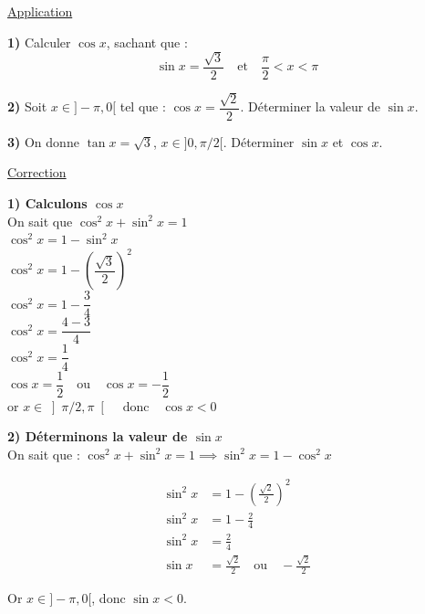 \documentclass[12pt,a4paper]{article}
\begin{document}
\begin{center}
    \textcolor{monRouge}{\underline{\Large Application}}
\end{center}

\noindent \textbf{1)} Calculer $\cos x$, sachant que :
\[ \sin x = \dfrac{\sqrt{3}}{2} \quad \text{et} \quad \dfrac{\pi}{2} < x < \pi \]

\noindent \textbf{2)} Soit $x \in ]-\pi, 0[$ tel que : $\cos x = \dfrac{\sqrt{2}}{2}$. Déterminer la valeur de $\sin x$.

\noindent \textbf{3)} On donne $\tan x = \sqrt{3}$, $x \in ]0, \pi/2[$. Déterminer $\sin x$ et $\cos x$.

\begin{center}
    \textcolor{monRouge}{\underline{Correction}}
\end{center}

\noindent \textbf{1) Calculons $\cos x$} \\
On sait que $\cos^2 x + \sin^2 x = 1$ \\
$\cos^2 x = 1 - \sin^2 x$ \\
$\cos^2 x = 1 - \left( \dfrac{\sqrt{3}}{2} \right)^2$ \\
$\cos^2 x = 1 - \dfrac{3}{4}$ \\
$\cos^2 x = \dfrac{4-3}{4}$ \\
$\cos^2 x = \dfrac{1}{4}$ \\
$\cos x = \dfrac{1}{2} \quad \text{ou} \quad \cos x = -\dfrac{1}{2}$ \\
or $x \in \left] \pi/2, \pi \right[ \quad \text{donc} \quad \cos x < 0$

\vspace{1em}

\begin{center}
\end{center}
\noindent \textbf{2) Déterminons la valeur de $\sin x$} \\
On sait que : $\cos^2 x + \sin^2 x = 1 \implies \sin^2 x = 1 - \cos^2 x$

\begin{align*}
    \sin^2 x &= 1 - \left( \frac{\sqrt{2}}{2} \right)^2 \\
    \sin^2 x &= 1 - \frac{2}{4} \\
    \sin^2 x &= \frac{2}{4} \\
    \sin x &= \frac{\sqrt{2}}{2} \quad \text{ou} \quad -\frac{\sqrt{2}}{2}
\end{align*}

\noindent Or $x \in ]-\pi, 0[$, donc $\sin x < 0$.
\end{document}
